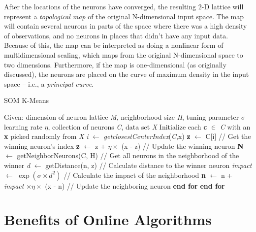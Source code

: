 \documentclass{l4proj}
\begin{document}
After the locations of the neurons have converged, the resulting 2-D lattice will represent a \textit{topological map} of the original N-dimensional input space. The map will contain several neurons in parts of the space where there was a high density of observations, and no neurons in places that didn't have any input data. Because of this, the map can be interpreted as doing a nonlinear form of multidimensional scaling, which maps from the original N-dimensional space to two dimensions\cite{MLIntro}. Furthermore, if the map is one-dimensional (as originally discussed), the neurons are placed on the curve of maximum density in the input space -- i.e., a \textit{principal curve}\cite{SOM}.

\begin{algorithm}[H]
\caption{SOM K-Means}\label{som-alg}
\begin{algorithmic}[1]
\State Given: dimension of neuron lattice \textit{M}, neighborhood size \textit{H}, tuning parameter $\sigma$
\State \hspace{1.1cm} learning rate $\eta$, collection of neurons \textit{C}, data set \textit{X}
\State Initialize each \textbf{c} $\in$ \textit{C} with an \textbf{x} picked randomly from \textit{X}
    \State \textit{i}  $\gets$ \textit{getclosestCenterIndex}(\textit{C},x)
    \State \textbf{z}  $\gets$ C[i] \hspace{3.85cm} // Get the winning neuron's index
    \State \textbf{z} $\gets$ z + $\eta \times$ (x - z) \hspace{2.35cm} // Update the winning neuron
    \State \textbf{N} $\gets$ getNeighborNeurons(C, H) \hspace{0.1cm} // Get all neurons in the neighborhood of the winner
        \State \textit{d} $\gets$ getDistance(n, z) \hspace{1.3cm} // Calculate distance to the winner neuron
        \State \textit{impact} $\gets$ $\exp(\sigma \times d^2)$ \hspace{1.15cm} // Calculate the impact of the neighborhood
        \State \textbf{n} $\gets$ n + \textit{impact} $\times \eta \times$ (x - n) \hspace{0.3cm} // Update the neighboring neuron
    \EndFor
    \State \textbf{end for}
\EndFor
\State \textbf{end for}
\end{algorithmic}
\end{algorithm}

\section{Benefits of Online Algorithms}
\end{document}
